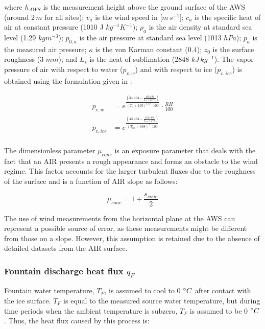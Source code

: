 where $h_{AWS}$ is the measurement height above the ground surface of the \ac{AWS} (around $2\,m$ for all sites);
$v_a$ is the wind speed in [$m\,s^{-1}$]; $c_a$ is the specific heat of air at constant pressure (1010 J
$kg^{-1} K^{-1}$); $\rho_{a}$ is the air density at standard sea level (1.29 $kg m^{-3}$); $p_{0,a}$ is the air
pressure at standard sea level (1013 $hPa$); $p_{a}$ is the measured air pressure; $\kappa$ is the von Karman
constant (0.4); $z_{0}$ is the surface roughness (3 $mm$); and $L_s$ is the heat of sublimation (2848
$kJ\,kg^{-1}$). The vapor pressure of air with respect to water ($p_{v,w}$) and with respect to ice
($p_{v,ice}$) is obtained using the formulation given in \cite{huangSimpleAccurateFormula2018}:

\begin{equation}
	\begin{split}
		p_{v,w}&=e^{\frac{(34.494 - \frac{4924.99}{T_{a} + 237.1})}{(T_a + 105)^{1.57} \cdot 100}} \cdot \frac{RH}{100} \\
		p_{v,ice}&=e^{\frac{(43.494 - \frac{6545.89}{T_{ice} + 278})}{(T_{ice} + 868)^{2} \cdot 100}} \\
	\end{split} \label{eqn:vp}
\end{equation}

The dimensionless parameter $\mu_{cone}$ is an exposure parameter that deals with the fact that an \ac{AIR} presents a rough
appearance and forms an obstacle to the wind regime. This factor accounts for the larger turbulent fluxes due to
the roughness of the surface \citep{oerlemansBriefCommunicationGrowth2021} and is a function of \ac{AIR} slope
as follows:

\begin{equation}
	\mu_{cone} = 1 + \frac{s_{cone}}{2}
	\label{eqn:mu}
\end{equation}

The use of wind measurements from the horizontal plane at the \ac{AWS} can represent a possible source of error,
as these measurements might be different from those on a slope. However, this assumption is retained due to the absence of detailed datasets from the \ac{AIR} surface.

\subsubsection{Fountain discharge heat flux \texorpdfstring{$q_{F}$}{Lg} } \label{sec:heatflux}

Fountain water temperature, $T_F$, is assumed to cool to 0 $^{\circ} C$ after contact with the ice surface.
$T_F$ is equal to the measured source water temperature, but during time periods when the ambient temperature is
subzero, $T_F$ is assumed to be 0 $^{\circ} C$. Thus, the heat flux caused by this process is:

